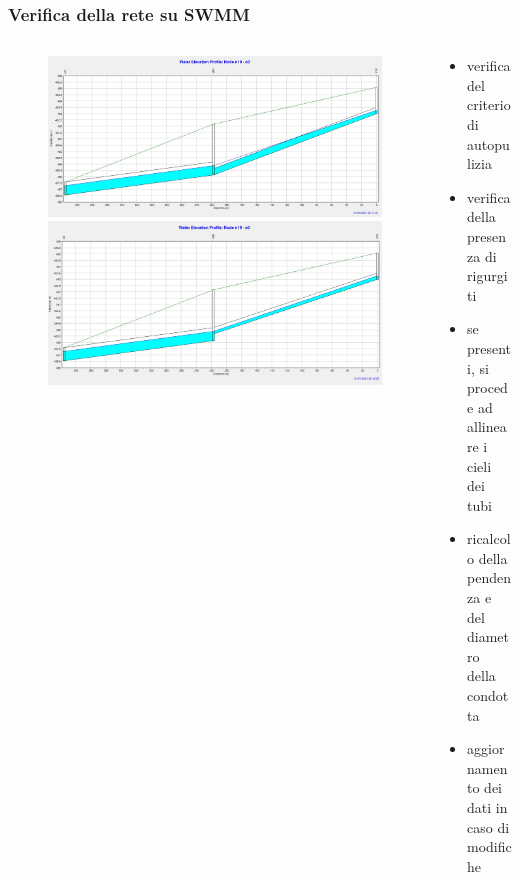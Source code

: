 \documentclass{beamer}
\begin{document}
\begin{frame}
 \frametitle{Verifica della rete su SWMM}
 
 \begin{columns}
  \begin{column}{.5\textwidth}
  \begin{figure}
   \centering
   \begin{overprint}
     \includegraphics[width=\linewidth]{images/rigurgito}
     \includegraphics[width=\linewidth]{images/allineamento_cieli}
   \end{overprint}
  \end{figure}   
  \end{column}
  
  \begin{column}{.5\textwidth}
   \begin{itemize}
    \item verifica del criterio di autopulizia
    \item verifica della presenza di rigurgiti
    \item se presenti, si procede ad allineare i cieli dei tubi
    \item ricalcolo della pendenza e del diametro della condotta
   \item aggiornamento dei dati in caso di modifiche
   \end{itemize}
  \end{column}
 \end{columns}
\end{frame}
\end{document}
